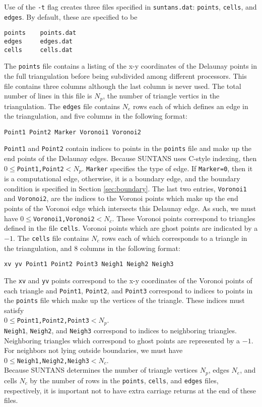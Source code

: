 Use of the \verb+-t+ flag creates three files specified in \verb+suntans.dat+: 
\verb+points+, \verb+cells+, and \verb+edges+.  By default, these are specified
to be
\begin{verbatim}
points    points.dat
edges     edges.dat
cells     cells.dat
\end{verbatim}
The \verb+points+ file contains a listing of the x-y coordinates of the Delaunay points
in the full triangulation before being subdivided among different processors. 
This file contains three columns although the last column is never used.  The
total number of lines in this file is $N_p$, the number of triangle vertics in the triangulation.
The \verb+edges+ file contains $N_e$ rows each of which defines an
edge in the triangulation, and five columns in the following format:
\begin{verbatim}
Point1 Point2 Marker Voronoi1 Voronoi2
\end{verbatim}
\verb+Point1+ and \verb+Point2+ contain indices to points in the \verb+points+ file
and make up the end points of the Delaunay edges.  Because SUNTANS uses C-style
indexing, then $0\le$\verb+Point1,Point2+$<N_p$.  \verb+Marker+ specifies the type
of edge.  If \verb+Marker=0+, then it is a computational edge, otherwise, it is
a boundary edge, and the boundary condition is specified in Section \ref{sec:boundary}.
The last two entries, \verb+Voronoi1+ and \verb+Voronoi2+, are the indices to the Voronoi
points which make up the end points of the Voronoi edge which intersects this Delaunay edge.
As such, we must have $0\le$\verb+Voronoi1,Voronoi2+$<N_c$.
These Voronoi points correspond to triangles defined in the file \verb+cells+.  Voronoi points
which are ghost points are indicated by a $-1$.
The \verb+cells+ file contains $N_c$ rows each of which corresponds to a
triangle in the triangulation, and 8 columns in the following format:
\begin{verbatim}
xv yv Point1 Point2 Point3 Neigh1 Neigh2 Neigh3
\end{verbatim}
The \verb+xv+ and \verb+yv+ points correspond to the x-y coordinates
of the Voronoi points of each triangle and \verb+Point1+, \verb+Point2+, and \verb+Point3+
correspond to indices to points in the \verb+points+ file which make up the
vertices of the triangle.  These indices must satisfy \\
$0\le$\verb+Point1,Point2,Point3+$<N_p$. \\
\verb+Neigh1+, \verb+Neigh2+, and
\verb+Neigh3+ correspond to indices to neighboring triangles.  Neighboring
triangles which correspond to ghost points are represented by a $-1$.  For neighbors
not lying outside boundaries, we must have \\
$0\le$\verb+Neigh1,Neigh2,Neigh3+$<N_c$.\\
Because SUNTANS determines the number of triangle vertices $N_p$, edges $N_e$, and cells $N_c$
by the number of rows in the \verb+points+, \verb+cells+, and \verb+edges+ files, respectively,
it is important not to have extra carriage returns at the end of these files.

